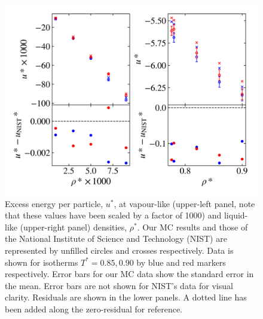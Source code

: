 \documentclass[10pt, twocolumn]{revtex4}    %
\begin{document}
\begin{figure}
	\includegraphics[width=\linewidth]{figures/NIST_comparison/NIST_u.png}
	\caption{Excess energy per particle, $u^{*}$, at vapour-like (upper-left panel, note that these values have been scaled by a factor of 1000) and liquid-like (upper-right panel) densities, $\rho{}^{*}$. Our MC results and those of the National Institute of Science and Technology (NIST) are represented by unfilled circles and crosses respectively. Data is shown for isotherms $T^{*}=0.85, 0.90$ by blue and red markers respectively. Error bars for our MC data show the standard error in the mean. Error bars are not shown for NIST's data for visual clarity. Residuals are shown in the lower panels. A dotted line has been added along the zero-residual for reference.}
	\label{fig:NIST_u}
\end{figure}
\end{document}
